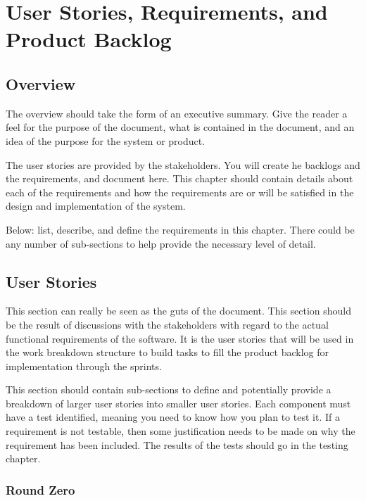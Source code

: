 
\chapter{User Stories,  Requirements, and Product Backlog}
\section{Overview}


The overview should take the form of an executive summary.  Give the reader a feel 
for the purpose of the document, what is contained in the document, and an idea 
of the purpose for the system or product. 

 The user stories 
are provided by the stakeholders.  You will create he backlogs and the requirements, and document here.  
This chapter should contain 
details about each of the requirements and how the requirements are or will be 
satisfied in the design and implementation of the system.

Below:   list, describe, and define the requirements in this chapter.  
There could be any number of sub-sections to help provide the necessary level of 
detail. 




\section{User Stories}
This section can really be seen as the guts of the document.  This section should 
be the result of discussions with the stakeholders with regard to the actual functional 
requirements of the software.  It is the user stories that will be used in the 
work breakdown structure to build tasks to fill the product backlog for implementation 
through the sprints.

This section should contain sub-sections to define and potentially provide a breakdown 
of larger user stories into smaller user stories.   Each component must have a test identified, 
meaning you need to know how you plan to test it.  If a requirement is not testable, then 
some justification needs to be made on why the requirement has been included.  
 The results of the tests should go in the testing chapter. 



\subsection{Round Zero}

